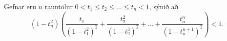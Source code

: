 Gefnar eru $n$ rauntölur $0<t_1\le t_2 \le\ldots \le t_n < 1$, sýnið að 
\[
(1-t_n^2)\left( \frac{t_1}{(1-t_1^2)^2}+\frac{t_2^2}{(1-t_2^3)^2}+\ldots+\frac{t_n^{n}}{(1-t_n^{n+1})^2} \right) <1.
\]
